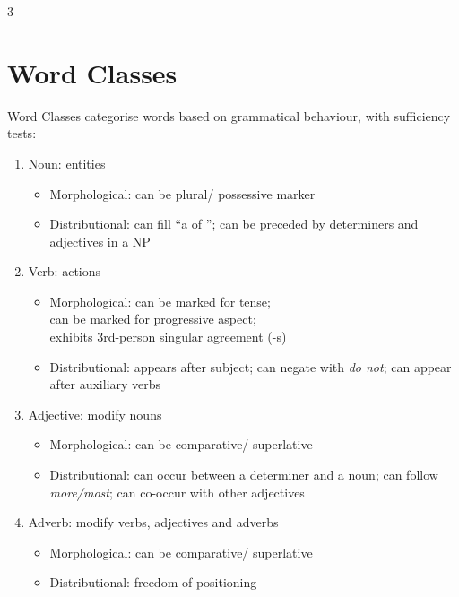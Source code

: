 \documentclass[12pt, a4paper]{article}
\begin{document}
\begin{multicols*}{3}
\section{Word Classes}
Word Classes categorise words based on grammatical behaviour, with sufficiency tests:
\begin{enumerate}[\roman*.]
  \item Noun: entities
  \begin{itemize}[leftmargin=*]\vspace{3pt}
      \item Morphological: can be plural/ possessive marker
      \item Distributional: can fill ``a \underline{\hspace{1em}} of \underline{\hspace{1em}}''; can be preceded by determiners and adjectives in a NP
    \end{itemize}
  \item Verb: actions
    \begin{itemize}[leftmargin=*]\vspace{3pt}
      \item Morphological: can be marked for tense;\\can be marked for progressive aspect;\\exhibits 3rd-person singular agreement (-s)
      \item Distributional: appears after subject; can negate with \textit{do not}; can appear after auxiliary verbs
    \end{itemize}
  \item Adjective: modify nouns
    \begin{itemize}[leftmargin=*]\vspace{3pt}
      \item Morphological: can be comparative/ superlative
      \item Distributional: can occur between a determiner and a noun; can follow \textit{more/most}; can co-occur with other adjectives
    \end{itemize}
  \item Adverb: modify verbs, adjectives and adverbs
    \begin{itemize}[leftmargin=*]\vspace{3pt}
      \item Morphological: can be comparative/ superlative 
      \item Distributional: freedom of positioning 
    \end{itemize}

\end{enumerate}
\end{multicols*}
\end{document}
